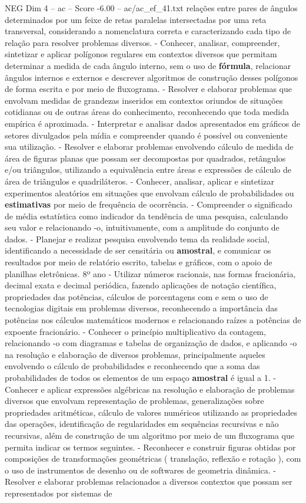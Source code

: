 \begin{textsample}{NEG Dim 4 – ac – Score -6.00 – ac/ac\_ef\_41.txt}
relações entre pares de ângulos determinados por um feixe de retas paralelas intersectadas por uma reta transversal, considerando a nomenclatura correta e caracterizando cada tipo de relação para resolver problemas diversos. - Conhecer, analisar, compreender, sintetizar e aplicar polígonos regulares em contextos diversos que permitam determinar a medida de cada ângulo interno, sem o uso de \textbf{fórmula}, relacionar ângulos internos e externos e descrever algoritmos de construção desses polígonos de forma escrita e por meio de fluxograma. - Resolver e elaborar problemas que envolvam medidas de grandezas inseridos em contextos oriundos de situações cotidianas ou de outras áreas do conhecimento, reconhecendo que toda medida empírica é aproximada. - Interpretar e analisar dados apresentados em gráficos de setores divulgados pela mídia e compreender quando é possível ou conveniente sua utilização. - Resolver e elaborar problemas envolvendo cálculo de medida de área de figuras planas que possam ser decompostas por quadrados, retângulos e/ou triângulos, utilizando a equivalência entre áreas e expressões de cálculo de área de triângulos e quadriláteros. - Conhecer, analisar, aplicar e sintetizar experimentos aleatórios em situações que envolvam cálculo de probabilidades ou \textbf{estimativas} por meio de frequência de ocorrência. - Compreender o significado de média estatística como indicador da tendência de uma pesquisa, calculando seu valor e relacionando -o, intuitivamente, com a amplitude do conjunto de dados. - Planejar e realizar pesquisa envolvendo tema da realidade social, identificando a necessidade de ser censitária ou \textbf{amostral}, e comunicar os resultados por meio de relatório escrito, tabelas e gráficos, com o apoio de planilhas eletrônicas. 8º ano - Utilizar números racionais, nas formas fracionária, decimal exata e decimal periódica, fazendo aplicações de notação científica, propriedades das potências, cálculos de porcentagens com e sem o uso de tecnologias digitais em problemas diversos, reconhecendo a importância das potências nos cálculos matemáticos modernos e relacionando raízes a potências de expoente fracionário. - Conhecer o princípio multiplicativo da contagem, relacionando -o com diagramas e tabelas de organização de dados, e aplicando -o na resolução e elaboração de diversos problemas, principalmente aqueles envolvendo o cálculo de probabilidades e reconhecendo que a soma das probabilidades de todos os elementos de um espaço \textbf{amostral} é igual a 1. - Conhecer e aplicar expressões algébricas na resolução e elaboração de problemas diversos que envolvam representação de problemas, generalizações sobre propriedades aritméticas, cálculo de valores numéricos utilizando as propriedades das operações, identificação de regularidades em sequências recursivas e não recursivas, além de construção de um algoritmo por meio de um fluxograma que permita indicar os termos seguintes. - Reconhecer e construir figuras obtidas por composições de transformações geométricas ( translação, reflexão e rotação ), com o uso de instrumentos de desenho ou de softwares de geometria dinâmica. - Resolver e elaborar problemas relacionados a diversos contextos que possam ser representados por sistemas de 
\end{textsample}
